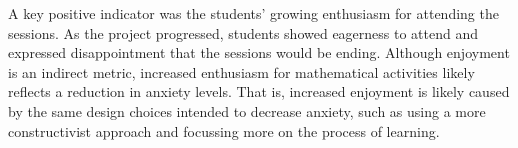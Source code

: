 \documentclass[11pt, a4paper, notitlepage]{article}
\begin{document}
\par
A key positive indicator was the students' growing enthusiasm for attending the sessions. As the project progressed, students showed eagerness to attend and expressed disappointment that the sessions would be ending. Although enjoyment is an indirect metric, increased enthusiasm for mathematical activities likely reflects a reduction in anxiety levels. That is, increased enjoyment is likely caused by the same design choices intended to decrease anxiety, such as using a more constructivist approach and focussing more on the process of learning.

\end{document}
